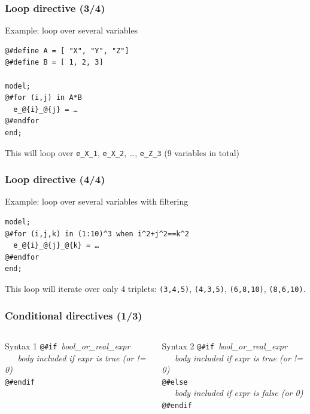 \documentclass[aspectratio=169]{beamer}
\begin{document}
\begin{frame}[fragile=singleslide]
  \frametitle{Loop directive (3/4)}
  \begin{block}{Example: loop over several variables}
    \small
\begin{verbatim}
@#define A = [ "X", "Y", "Z"]
@#define B = [ 1, 2, 3]

model;
@#for (i,j) in A*B
  e_@{i}_@{j} = …
@#endfor
end;
\end{verbatim}
    \normalsize
    This will loop over \texttt{e\_X\_1}, \texttt{e\_X\_2}, …, \texttt{e\_Z\_3} (9
    variables in total)
  \end{block}
\end{frame}

\begin{frame}[fragile=singleslide]
  \frametitle{Loop directive (4/4)}
  \begin{block}{Example: loop over several variables with filtering}
    \small
\begin{verbatim}
model;
@#for (i,j,k) in (1:10)^3 when i^2+j^2==k^2
  e_@{i}_@{j}_@{k} = …
@#endfor
end;
\end{verbatim}
    \normalsize
This loop will iterate over only 4 triplets: \texttt{(3,4,5)},
\texttt{(4,3,5)}, \texttt{(6,8,10)}, \texttt{(8,6,10)}.

  \end{block}
\end{frame}

\begin{frame}[fragile=singleslide]
  \frametitle{Conditional directives (1/3)}

  \begin{columns}[T]
    \begin{block}{Syntax 1}
\verb+@#if +\textit{bool\_or\_real\_expr} \\
\verb+   +\textit{body included if expr is true (or != 0)} \\
\verb+@#endif+
    \end{block}

    \begin{block}{Syntax 2}
\verb+@#if +\textit{bool\_or\_real\_expr} \\
\verb+   +\textit{body included if expr is true (or != 0)} \\
\verb+@#else+ \\
\verb+   +\textit{body included if expr is false (or 0)} \\
\verb+@#endif+
    \end{block}
  \end{columns}
\end{frame}
\end{document}
